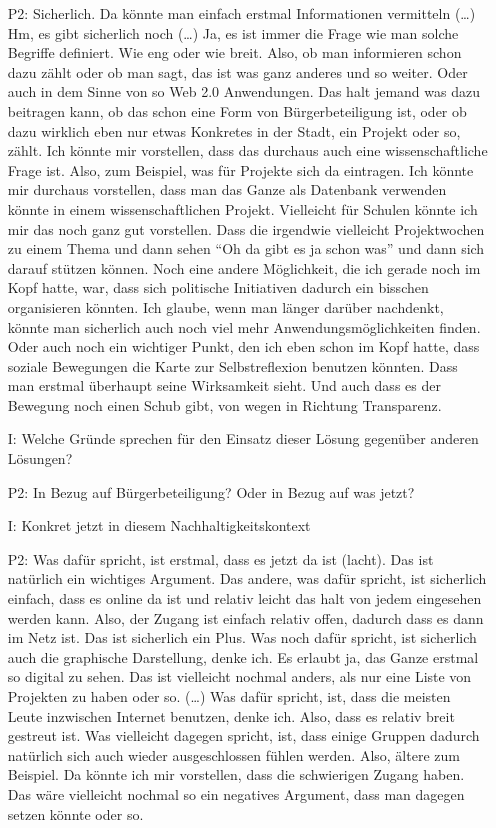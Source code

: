 \begin{itemize}
    \item[P2:] Sicherlich. Da k{\"o}nnte man einfach erstmal Informationen vermitteln (\dots) Hm, es gibt sicherlich noch (\dots) Ja, es ist immer die Frage wie man solche Begriffe definiert. Wie eng oder wie breit. Also, ob man informieren schon dazu z{\"a}hlt oder ob man sagt, das ist was ganz anderes und so weiter. Oder auch in dem Sinne von so Web 2.0 Anwendungen. Das halt jemand was dazu beitragen kann, ob das schon eine Form von B{\"u}rgerbeteiligung ist, oder ob dazu wirklich eben nur etwas Konkretes in der Stadt, ein Projekt oder so, z{\"a}hlt. Ich k{\"o}nnte mir vorstellen, dass das durchaus auch eine wissenschaftliche Frage ist. Also, zum Beispiel, was f{\"u}r Projekte sich da eintragen. Ich k{\"o}nnte mir durchaus vorstellen, dass man das Ganze als Datenbank verwenden k{\"o}nnte in einem wissenschaftlichen Projekt. Vielleicht f{\"u}r Schulen k{\"o}nnte ich mir das noch ganz gut vorstellen. Dass die irgendwie vielleicht Projektwochen zu einem Thema und dann sehen "`Oh da gibt es ja schon was"' und dann sich darauf st{\"u}tzen k{\"o}nnen. Noch eine andere M{\"o}glichkeit, die ich gerade noch im Kopf hatte, war, dass sich politische Initiativen dadurch ein bisschen organisieren k{\"o}nnten. Ich glaube, wenn man l{\"a}nger dar{\"u}ber nachdenkt, k{\"o}nnte man sicherlich auch noch viel mehr Anwendungsm{\"o}glichkeiten finden. Oder auch noch ein wichtiger Punkt, den ich eben schon im Kopf hatte, dass soziale Bewegungen die Karte zur Selbstreflexion benutzen k{\"o}nnten. Dass man erstmal {\"u}berhaupt seine Wirksamkeit sieht. Und auch dass es der Bewegung noch einen Schub gibt, von wegen in Richtung Transparenz.
    \item[I:] Welche Gr{\"u}nde sprechen f{\"u}r den Einsatz dieser L{\"o}sung gegen{\"u}ber anderen L{\"o}sungen?
    \item[P2:] In Bezug auf B{\"u}rgerbeteiligung? Oder in Bezug auf was jetzt?
    \item[I:] Konkret jetzt in diesem Nachhaltigkeitskontext
    \item[P2:] Was daf{\"u}r spricht, ist erstmal, dass es jetzt da ist (lacht). Das ist nat{\"u}rlich ein wichtiges Argument. Das andere, was daf{\"u}r spricht, ist sicherlich einfach, dass es online da ist und relativ leicht das halt von jedem eingesehen werden kann. Also, der Zugang ist einfach relativ offen, dadurch dass es dann im Netz ist. Das ist sicherlich ein Plus. Was noch daf{\"u}r spricht, ist sicherlich auch die graphische Darstellung, denke ich. Es erlaubt ja, das Ganze erstmal so digital zu sehen. Das ist vielleicht nochmal anders, als nur eine Liste von Projekten zu haben oder so. (\dots) Was daf{\"u}r spricht, ist, dass die meisten Leute inzwischen Internet benutzen, denke ich. Also, dass es relativ breit gestreut ist. Was vielleicht dagegen spricht, ist, dass einige Gruppen dadurch nat{\"u}rlich sich auch wieder ausgeschlossen f{\"u}hlen werden. Also, {\"a}ltere zum Beispiel. Da k{\"o}nnte ich mir vorstellen, dass die schwierigen Zugang haben. Das w{\"a}re vielleicht nochmal so ein negatives Argument, dass man dagegen setzen k{\"o}nnte oder so.

\end{itemize}
